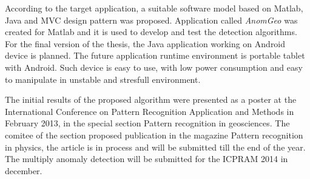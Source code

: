 \documentclass[FM]{tulthesis}
\begin{document}
According to the target application, a suitable software model based on Matlab, Java and MVC design pattern was proposed. Application called \emph{AnomGeo} was created for Matlab and it is used to develop and test the detection algorithms. For the final version of the thesis, the Java application working on Android device is planned. The future application runtime environment is portable tablet with Android. Such device is easy to use, with low power consumption and easy to manipulate in unstable and stresfull environment.

The initial results of the proposed algorithm were presented as a poster at the International Conference on Pattern Recognition Application and Methods in February 2013, in the special section Pattern recognition in geosciences. The comitee of the section proposed publication in the magazine Pattern recognition in physics, the article is in process and will be submitted till the end of the year. The multiply anomaly detection will be submitted for the ICPRAM 2014 in december.
\end{document}
